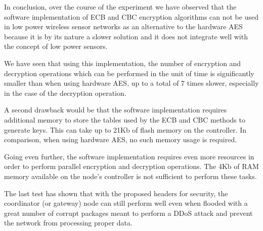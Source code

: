 In conclusion, over the course of the experiment we have observed that the 
software implementation of ECB and CBC encryption algorithms can not be used in low 
power wireless sensor networks as an alternative to the hardware AES because it 
is by its nature a slower solution and it does not integrate well with the 
concept of low power sensors.

We have seen that using this implementation, the number of encryption 
and decryption operations which can be performed in the unit of time 
is significantly smaller than when using hardware AES, up to a total 
of 7 times slower, especially in the case of the decryption operation.

A second drawback would be that the software implementation requires 
additional memory to store the tables used by the ECB and CBC methods 
to generate keys. This can take up to 21Kb of flash memory on the controller.
In comparison, when using hardware AES, no such memory usage is required.

Going even further, the software implementation requires even more resources 
in order to perform parallel encryption and decryption operations. The 4Kb of 
RAM memory available on the node's controller is not sufficient to perform these tasks.

The last test has shown that with the proposed headers for security, the coordinator (or 
gateway) node can still perform well even when flooded with a great number of corrupt 
packages meant to perform a DDoS attack and prevent the network from processing 
proper data.

